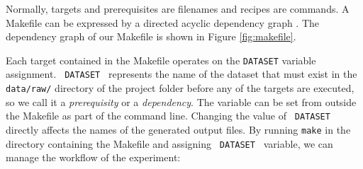 Normally, targets and prerequisites are filenames and recipes are commands. A Makefile can be expressed by a directed acyclic dependency graph \cite{feldman1979make}. The dependency graph of our Makefile is shown in Figure \ref{fig:makefile}. 
 
 Each target contained in the Makefile operates on the \texttt{DATASET} variable assignment.  \texttt{ DATASET } represents the name of the dataset that must exist in the \texttt{data/raw/} directory of the project folder before any of the targets are executed, so we call it a \textit{prerequisity} or a \textit{dependency}. The variable can be set from outside the Makefile as part of the command line. Changing the value of \texttt{ DATASET } directly affects the names of the generated output files. By running \texttt{make} in the directory containing the Makefile and assigning \texttt{ DATASET } variable, we can manage the workflow of the experiment:
 
